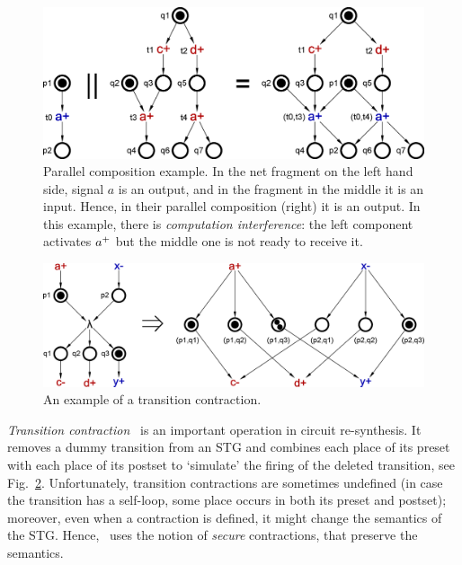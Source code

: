 \begin{figure}[t]
    \centering
    \includegraphics[scale=0.4]{EXPERIMENTS/stg/pcomp_example}
    \caption{\label{fig_parcom}
        Parallel composition example. In the net fragment on the left hand side,
        signal $a$ is an output, and in the fragment in the middle it is an input.
        Hence, in their parallel composition (right) it is an output.
        In this example, there is \emph{computation interference}: the left component activates $a^+$ but the middle one is not ready to receive it.}
\end{figure}

\smallskip


\begin{figure}[!tb]
    \centering
    \includegraphics[scale=0.4]{EXPERIMENTS/stg/transition_contraction}
    \caption{\label{fig3.1}
        An example of a transition contraction.
    }
\end{figure}


\emph{Transition contraction}~\cite{vowo02lncs} is an important operation in circuit re-synthesis. It removes a dummy transition from an STG and
combines each place of its preset with each place of its postset to `simulate' the
firing of the deleted transition, see Fig.~\ref{fig3.1}. Unfortunately, transition contractions are sometimes undefined (\eg in case the transition has a self-loop, \ie some place occurs in both its preset and postset); moreover, even when a contraction is defined, it might change the semantics of the STG.
Hence,~\cite{vowo02lncs} uses the notion of \emph{secure} contractions, that preserve the semantics.

